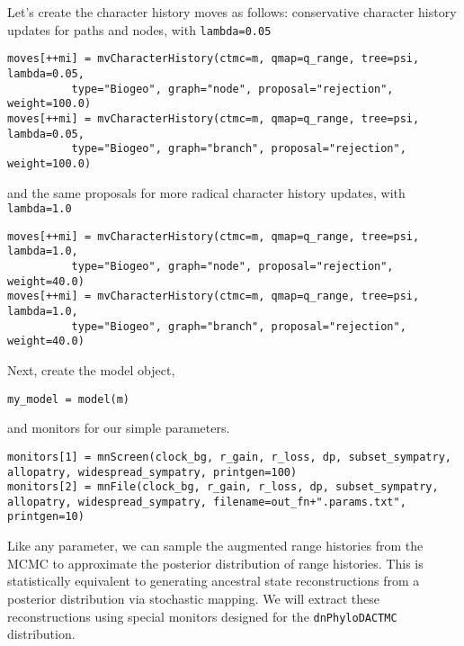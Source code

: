 Let's create the character history moves as follows: conservative character history updates for paths and nodes, with {\tt lambda=0.05}

\begin{snugshade}
\begin{lstlisting}
moves[++mi] = mvCharacterHistory(ctmc=m, qmap=q_range, tree=psi, lambda=0.05, 
          type="Biogeo", graph="node", proposal="rejection", weight=100.0)
moves[++mi] = mvCharacterHistory(ctmc=m, qmap=q_range, tree=psi, lambda=0.05, 
          type="Biogeo", graph="branch", proposal="rejection", weight=100.0)
\end{lstlisting}
\end{snugshade}

and the same proposals for more radical character history updates, with {\tt lambda=1.0}

\begin{snugshade}
\begin{lstlisting}
moves[++mi] = mvCharacterHistory(ctmc=m, qmap=q_range, tree=psi, lambda=1.0, 
          type="Biogeo", graph="node", proposal="rejection", weight=40.0)
moves[++mi] = mvCharacterHistory(ctmc=m, qmap=q_range, tree=psi, lambda=1.0, 
          type="Biogeo", graph="branch", proposal="rejection", weight=40.0)
\end{lstlisting}
\end{snugshade}

Next, create the model object,

\begin{snugshade}
\begin{lstlisting}
my_model = model(m)
\end{lstlisting}
\end{snugshade}

and monitors for our simple parameters.

\begin{snugshade}
\begin{lstlisting}
monitors[1] = mnScreen(clock_bg, r_gain, r_loss, dp, subset_sympatry, allopatry, widespread_sympatry, printgen=100)
monitors[2] = mnFile(clock_bg, r_gain, r_loss, dp, subset_sympatry, allopatry, widespread_sympatry, filename=out_fn+".params.txt", printgen=10)
\end{lstlisting}
\end{snugshade}

Like any parameter, we can sample the augmented range histories from the MCMC to approximate the posterior distribution of range histories.
This is statistically equivalent to generating ancestral state reconstructions from a posterior distribution via stochastic mapping.
We will extract these reconstructions using special monitors designed for the {\tt dnPhyloDACTMC} distribution.

